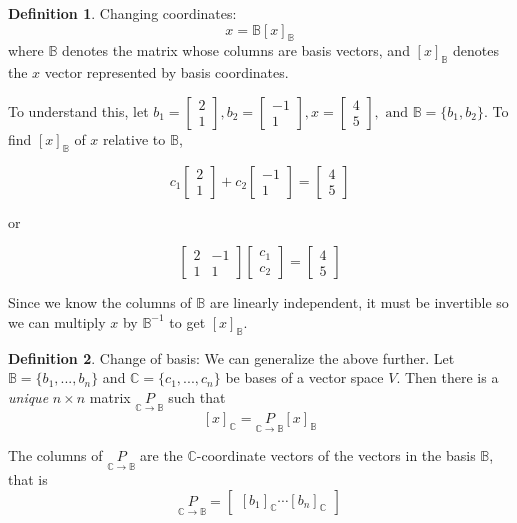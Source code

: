 \documentclass[letterpaper]{article}
\theoremstyle{definition}
\newtheorem{definition}{Definition}[section]
\begin{document}
\begin{definition}{Changing coordinates: }
$$x = \mathbb{B} [x]_{\mathbb{B}}$$
where $\mathbb{B}$ denotes the matrix whose columns are basis vectors, and $[x]_{\mathbb{B}}$ denotes the $x$ vector represented by basis coordinates. 

To understand this, let $b_1 = \begin{bmatrix}
2 \\
1
\end{bmatrix} , b_2 = \begin{bmatrix}
-1 \\
1
\end{bmatrix} , x = \begin{bmatrix}
4 \\
5
\end{bmatrix} , \text{ and }\mathbb{B} = \{b_1, b_2\}$. To find $[x]_{\mathbb{B}}$ of $x$ relative to $\mathbb{B}$,

$$ c_1 \begin{bmatrix}
2 \\
1
\end{bmatrix} + c_2 \begin{bmatrix}
-1 \\ 
1
\end{bmatrix} = \begin{bmatrix}
4 \\
5
\end{bmatrix}
$$

or

$$ \begin{bmatrix}
2 & -1 \\
1 & 1
\end{bmatrix} 
\begin{bmatrix}
c_1 \\
c_2
\end{bmatrix} 
= \begin{bmatrix}
4 \\
5
\end{bmatrix}
$$ 

Since we know the columns of $\mathbb{B}$ are linearly independent, it must be invertible so we can multiply $x$ by $\mathbb{B}^{-1}$ to get $[x]_{\mathbb{B}}$. 
\end{definition}

\begin{definition}{Change of basis: }
We can generalize the above further. Let $\mathbb{B} = \{ b_1 , ..., b_n \}$ and $\mathbb{C} = \{ c_1 , ..., c_n \}$ be bases of a vector space $V$. Then there is a \textit{unique} $n \times n$ matrix $\underset{\mathbb{C} \rightarrow \mathbb{B}}{P}$ such that
$$[x]_{\mathbb{C}} = \underset{\mathbb{C} \rightarrow \mathbb{B}}{P} [x]_{\mathbb{B}} $$

The columns of $\underset{\mathbb{C} \rightarrow \mathbb{B}}{P}$ are the $\mathbb{C}$-coordinate vectors of the vectors in the basis $\mathbb{B}$, that is
$$ \underset{\mathbb{C} \rightarrow \mathbb{B}}{P} = \begin{bmatrix}
[b_1 ]_{\mathbb{C}} \cdots [b_n]_{\mathbb{C}}
\end{bmatrix}$$

\end{definition}
\end{document}
